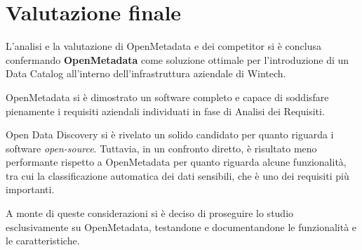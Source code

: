 \section{Valutazione finale}
L'analisi e la valutazione di OpenMetadata e dei competitor si è conclusa confermando \textbf{OpenMetadata} come soluzione ottimale per l'introduzione di un Data Catalog all'interno dell'infrastruttura aziendale di Wintech.

OpenMetadata si è dimostrato un software completo e capace di soddisfare pienamente i requisiti aziendali individuati in fase di Analisi dei Requisiti.

Open Data Discovery si è rivelato un solido candidato per quanto riguarda i software \emph{open-source}. Tuttavia, in un confronto diretto, è risultato meno performante rispetto a OpenMetadata per quanto 
riguarda alcune funzionalità, tra cui la classificazione automatica dei dati sensibili, che è uno dei requisiti più importanti.

A monte di queste considerazioni si è deciso di proseguire lo studio esclusivamente su OpenMetadata, testandone e documentandone le funzionalità e le caratteristiche.